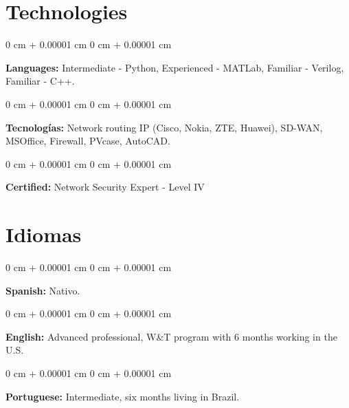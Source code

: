 \documentclass[10pt, letterpaper]{article}
\newenvironment{onecolentry}{
    \begin{adjustwidth}{
        0 cm + 0.00001 cm
    }{
        0 cm + 0.00001 cm
    }
}{
    \end{adjustwidth}
} %
\begin{document}
\section{Technologies}



        
        \begin{onecolentry}
            \textbf{Languages:} Intermediate - Python, Experienced - MATLab, Familiar - Verilog, Familiar - C++.
        \end{onecolentry}

        \vspace{0.2 cm}

        \begin{onecolentry}
            \textbf{Tecnologías:} Network routing IP (Cisco, Nokia, ZTE, Huawei), SD-WAN, MSOffice, Firewall, PVcase, AutoCAD.
        \end{onecolentry}

        \vspace{0.2 cm}

        \begin{onecolentry}
            \textbf{Certified:} Network Security Expert - Level IV
        \end{onecolentry}





    
\section{Idiomas}



        
        \begin{onecolentry}
            \textbf{Spanish:} Nativo.
        \end{onecolentry}

        \vspace{0.2 cm}

        \begin{onecolentry}
            \textbf{English:} Advanced professional, W&T program with 6 months working in the U.S.
        \end{onecolentry}

        \vspace{0.2 cm}

        \begin{onecolentry}
            \textbf{Portuguese:} Intermediate, six months living in Brazil.
        \end{onecolentry}
\end{document}
